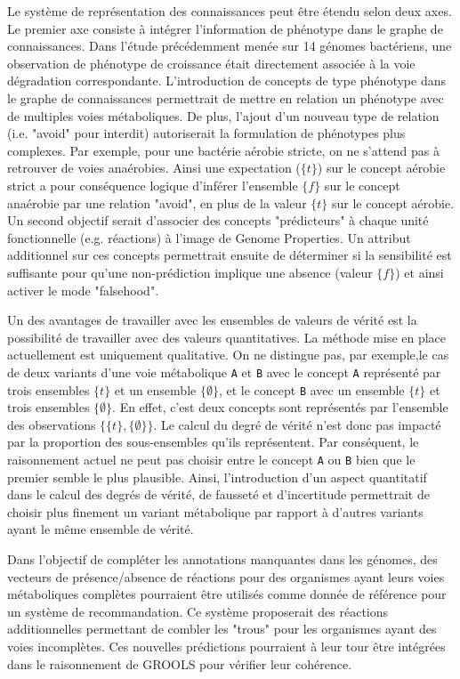 \begin{refsegment}
Le système de représentation des connaissances peut être étendu selon deux axes. Le premier axe consiste à intégrer l'information de phénotype dans le graphe de connaissances. Dans l'étude précédemment menée sur 14 génomes bactériens, une observation de phénotype de croissance était directement associée à la voie dégradation correspondante. L'introduction de concepts de type phénotype dans le graphe de connaissances permettrait de mettre en relation un phénotype avec de multiples voies métaboliques. De plus, l'ajout d'un nouveau type de relation (i.e. "avoid" pour interdit) autoriserait la formulation de phénotypes plus complexes. Par exemple, pour une bactérie aérobie stricte, on ne s'attend pas à retrouver de voies anaérobies. Ainsi une expectation ($\{t\}$) sur le concept aérobie strict a pour conséquence logique d'inférer l'ensemble $\{f\}$ sur le concept anaérobie par une relation "avoid", en plus de la valeur $\{t\}$ sur le concept aérobie. Un second objectif serait d'associer des concepts "prédicteurs" à chaque unité fonctionnelle (e.g. réactions) à l'image de Genome Properties. Un attribut additionnel sur ces concepts permettrait ensuite de déterminer si la sensibilité est suffisante pour qu'une non-prédiction implique une absence (valeur $\{f\}$) et ainsi activer le mode "falsehood". 

Un des avantages de travailler avec les ensembles de valeurs de vérité est la possibilité de travailler avec des valeurs quantitatives. La méthode mise en place actuellement est uniquement qualitative. On ne distingue pas, par exemple,le cas de deux variants d'une voie métabolique \texttt{A} et \texttt{B} avec le concept \texttt{A} représenté par trois ensembles $\{t\}$ et un ensemble $\{\emptyset\}$, et le concept \texttt{B} avec un ensemble $\{t\}$ et trois ensembles $\{\emptyset\}$. En effet, c'est deux concepts sont représentés par l'ensemble des observations $\{\{t\},\{\emptyset\}\}$. Le calcul du degré de vérité n'est donc pas impacté par la proportion des sous-ensembles qu'ils représentent. Par conséquent, le raisonnement actuel ne peut pas choisir entre le concept \texttt{A} ou \texttt{B} bien que le premier semble le plus plausible. Ainsi, l'introduction d'un aspect quantitatif dans le calcul des degrés de vérité, de fausseté et d'incertitude permettrait de choisir plus finement un variant métabolique par rapport à d'autres variants ayant le même ensemble de vérité.

Dans l'objectif de compléter les annotations manquantes dans les génomes, des vecteurs de présence/absence de réactions pour des organismes ayant leurs voies métaboliques complètes pourraient être utilisés comme donnée de référence pour un système de recommandation. Ce système proposerait des réactions additionnelles permettant de combler les "trous" pour les organismes ayant des voies incomplètes. Ces nouvelles prédictions pourraient à leur tour être intégrées dans le raisonnement de GROOLS pour vérifier leur cohérence.


\end{refsegment}
